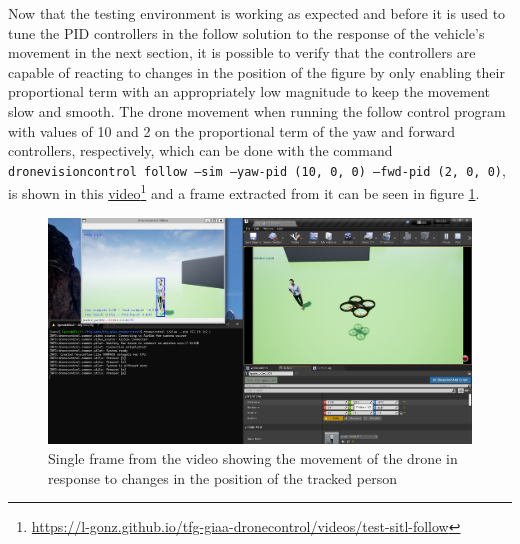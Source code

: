 Now that the testing environment is working as expected and before it is used to tune the PID controllers in the follow solution to the response of the vehicle's movement in the next section, it is possible to verify that the controllers are capable of reacting to changes in the position of the figure by only enabling their proportional term with an appropriately low magnitude to keep the movement slow and smooth.
The drone movement when running the follow control program with values of 10 and 2 on the proportional term of the yaw and forward controllers, respectively, which can be done with the command \texttt{dronevisioncontrol follow --sim --yaw-pid (10, 0, 0) --fwd-pid (2, 0, 0)}, is shown in this \href{https://l-gonz.github.io/tfg-giaa-dronecontrol/videos/test-sitl-follow}{video}\footnote{\url{https://l-gonz.github.io/tfg-giaa-dronecontrol/videos/test-sitl-follow}} and a frame extracted from it can be seen in figure \ref{fig:airsim-test-follow}.

\begin{figure}
  \centering
  \includegraphics[width=\textwidth, keepaspectratio]{img/video-follow-sitl.png}
  \caption{Single frame from the video showing the movement of the drone in response to changes in the position of the tracked person}
  \label{fig:airsim-test-follow}
\end{figure}


\clearpage